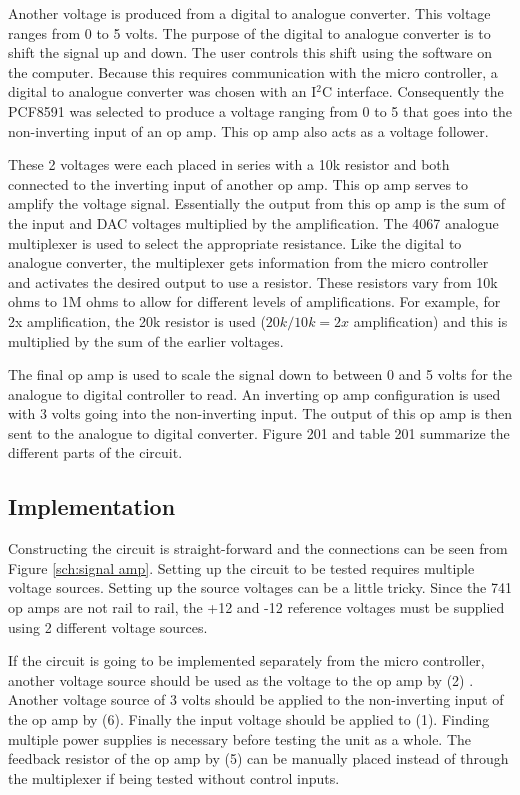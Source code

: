 Another voltage is produced from a digital to analogue converter. This voltage
 ranges from 0 to 5 volts. The purpose of the digital to analogue converter is
 to shift the signal up and down. The user controls this shift using the
 software on the computer. Because this requires communication with the micro
 controller, a digital to analogue converter was chosen with an 
I$^2$C interface. Consequently the PCF8591 was selected to 
produce a voltage ranging from 0 to 5 that goes into the non-inverting input 
of an op amp. This op amp also acts as a voltage follower.

These 2 voltages were each placed in series with a 10k resistor and both 
connected to the inverting input of another op amp. This op amp serves to 
amplify the voltage signal. Essentially the output from this op amp is the sum
 of the input and DAC voltages multiplied by the amplification\cite{bk:olia}. The 4067
 analogue multiplexer is used to select the appropriate resistance. Like the 
digital to analogue converter, the multiplexer gets information from the micro
 controller and activates the desired output to use a resistor. These
 resistors vary from 10k ohms to 1M ohms to allow for different levels of 
amplifications. For example, for 2x amplification, the 20k resistor is used 
($20k/10k = 2x$ amplification) and this is multiplied by the sum of the 
earlier voltages\cite{bk:olia}.

The final op amp is used to scale the signal down to between 0 and 5 volts for 
the analogue to digital controller to read. An inverting op amp configuration 
is used with 3 volts going into the non-inverting input.
The output of this op amp is then sent to the analogue to digital converter.
Figure 201 and table 201 summarize the different parts of the circuit.

\subsection{Implementation}
Constructing the circuit is straight-forward and the connections can be seen 
from Figure \ref{sch:signal amp}. Setting up the circuit to be tested requires 
multiple voltage sources. Setting up the source voltages can be a little tricky.
Since the 741 op amps are not rail to rail, the +12 and -12 reference voltages 
must be supplied using 2 different voltage sources. 

If the circuit is going to be implemented separately from the micro controller, another voltage source should be used as the voltage to the op amp by (2) 
. Another voltage source of 3 volts should be applied to the non-inverting 
input of the op amp by (6). Finally the input voltage should be applied to 
(1). Finding multiple power supplies is necessary before testing the unit as a 
whole.  The feedback resistor of the op amp by (5) can be manually placed
 instead of through the multiplexer if being tested without control inputs. 

